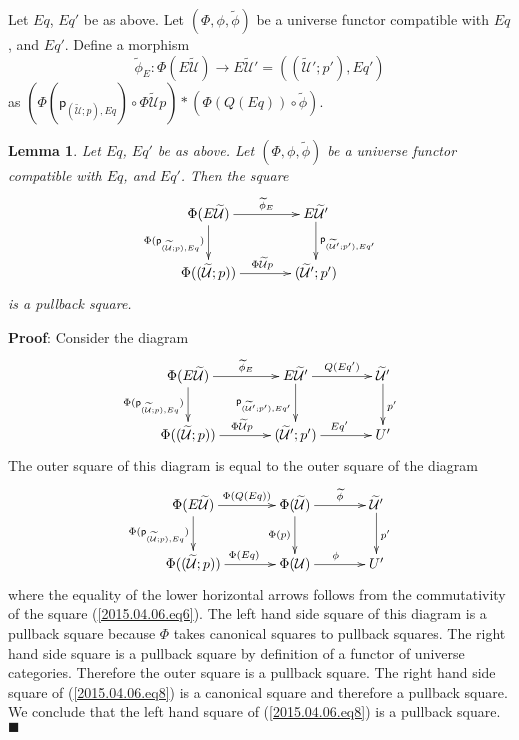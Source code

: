 \documentclass[12pt]{article}
\numberwithin{equation}{section}
\newenvironment{eq}{\begin{equation}}{\end{equation}}
\newenvironment{myproof}{{\bf Proof}:}{$\blacksquare$ \vskip 5mm }
\newtheorem{lemma}[proposition]{Lemma}
\newcommand{\llabel}[1]{\label{#1}}
\newcommand{\sr}{\rightarrow}
\newcommand{\wt}{\widetilde}
\newcommand{\p}{\mathsf{p}}
\newcommand{\U}{\mathcal{U}}
\begin{document}
%
Let $Eq$, $Eq'$ be as above. Let $(\Phi,\phi,\wt{\phi})$ be a universe functor
compatible with $Eq$, and $Eq'$. Define a morphism
%
$$\wt{\phi}_{E}:\Phi(E\wt{\U})\sr E\wt{\U}'=((\wt{\U}';p'),Eq')$$
%
as $(\Phi(\p_{(\wt{\U};p),Eq})\circ \Phi\wt{\U}p)*(\Phi(Q(Eq))\circ \wt{\phi})$.
%
\begin{lemma}
\llabel{2015.04.06.l4} Let $Eq$, $Eq'$ be as above. Let $(\Phi,\phi,\wt{\phi})$
be a universe functor compatible with $Eq$, and $Eq'$. Then the square
%
$$
\begin{xy}
          \xymatrix@C=3pc{ \Phi(E\wt{\U}) \ar[r]^-{\wt{\phi}_{E}}
            \ar[d]_{\Phi(\p_{(\wt{\U};p),Eq})} & E\wt{\U}'
            \ar[d]^{\p_{(\wt{\U}';p'),Eq'}}\\ \Phi((\wt{\U};p))
            \ar[r]^{\Phi\wt{\U}p} & (\wt{\U}';p') }
\end{xy}
$$
%
is a pullback square.
%
\end{lemma} 
%
\begin{myproof}
Consider the diagram
%
\begin{eq}\llabel{2015.04.06.eq8}
\begin{xy}
          \xymatrix@C=3pc{ \Phi(E\wt{\U})
            \ar[r]^-{\wt{\phi}_{E}}\ar[d]_{\Phi(\p_{(\wt{\U};p),Eq})} & E\wt{\U}'
            \ar[r]^-{Q(Eq')}\ar[d]_{\p_{(\wt{\U}';p'),Eq'}} & \wt{\U}'
            \ar[d]^{p'}\\ \Phi((\wt{\U};p)) \ar[r]^{\Phi\wt{\U}p} & (\wt{\U}';p')
            \ar[r]^{Eq'} & U' }
\end{xy}
\end{eq}
%
The outer square of this diagram is equal to the outer square of the diagram
%
\begin{eq}\llabel{2015.04.06.eq7}
\begin{xy}
          \xymatrix@C=3pc{ \Phi(E\wt{\U})
            \ar[r]^-{\Phi(Q(Eq))}\ar[d]_{\Phi(\p_{(\wt{\U};p),Eq})} &
            \Phi(\wt{\U}) \ar[r]^-{\wt{\phi}}\ar[d]_{\Phi(p)} & \wt{\U}'
            \ar[d]^{p'}\\ \Phi((\wt{\U};p)) \ar[r]^{\Phi(Eq)} & \Phi(\U)
            \ar[r]^{\phi} & U' }
\end{xy}
\end{eq}
%
where the equality of the lower horizontal arrows follows from the
commutativity of the square (\ref{2015.04.06.eq6}). The left hand side square
of this diagram is a pullback square because $\Phi$ takes canonical squares to
pullback squares. The right hand side square is a pullback square by definition
of a functor of universe categories. Therefore the outer square is a pullback
square. The right hand side square of (\ref{2015.04.06.eq8}) is a canonical
square and therefore a pullback square. We conclude that the left hand square
of (\ref{2015.04.06.eq8}) is a pullback square.
\end{myproof}
\end{document}
